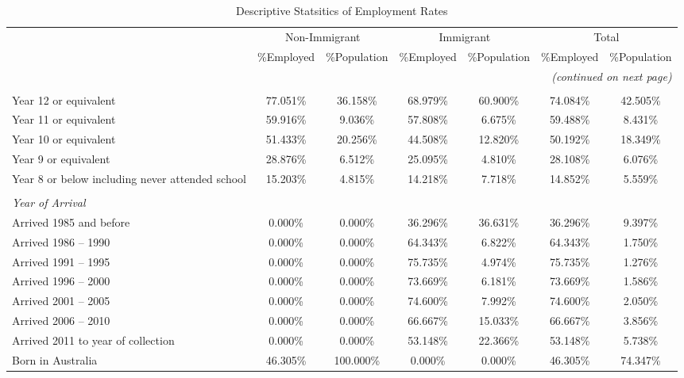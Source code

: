 \scriptsize\begin{longtable}{l*6c}
  \caption{Descriptive Statsitics of Employment Rates\label{tab:desp}} \\
  \toprule
  & \multicolumn{2}{c}{Non-Immigrant}
  & \multicolumn{2}{c}{Immigrant}
  & \multicolumn{2}{c}{Total} \\
  & \%Employed & \%Population
  & \%Employed & \%Population
  & \%Employed & \%Population \\
  \endhead
  \multicolumn{7}{r}{\textit{(continued on next page)}} \\\midrule
  \endfoot
  \bottomrule
  \endlastfoot
  \multicolumn{7}{l}{\textit{Education}} \\ \hline
  Year 12 or equivalent
  & 77.051\% & 36.158\%  & 68.979\% & 60.900\% & 74.084\% & 42.505\% \\
  Year 11 or equivalent
  & 59.916\% & 9.036\%   & 57.808\% & 6.675\%  & 59.488\% & 8.431\%  \\
  Year 10 or equivalent
  & 51.433\% & 20.256\%  & 44.508\% & 12.820\% & 50.192\% & 18.349\% \\
  Year 9 or equivalent
  & 28.876\% & 6.512\%   & 25.095\% & 4.810\%  & 28.108\% & 6.076\%  \\
  Year 8 or below including never attended school
  & 15.203\% & 4.815\%   & 14.218\% & 7.718\%  & 14.852\% & 5.559\%  \\
  \\
  \multicolumn{7}{l}{\textit{Year of Arrival}} \\ \hline
  Arrived 1985 and before
  & 0.000\%  & 0.000\%   & 36.296\% & 36.631\% & 36.296\% & 9.397\%  \\
  Arrived 1986 -- 1990
  & 0.000\%  & 0.000\%   & 64.343\% & 6.822\%  & 64.343\% & 1.750\%  \\
  Arrived 1991 -- 1995
  & 0.000\%  & 0.000\%   & 75.735\% & 4.974\%  & 75.735\% & 1.276\%  \\
  Arrived 1996 -- 2000
  & 0.000\%  & 0.000\%   & 73.669\% & 6.181\%  & 73.669\% & 1.586\%  \\
  Arrived 2001 -- 2005
  & 0.000\%  & 0.000\%   & 74.600\% & 7.992\%  & 74.600\% & 2.050\%  \\
  Arrived 2006 -- 2010
  & 0.000\%  & 0.000\%   & 66.667\% & 15.033\% & 66.667\% & 3.856\%  \\
  Arrived 2011 to year of collection
  & 0.000\%  & 0.000\%   & 53.148\% & 22.366\% & 53.148\% & 5.738\%  \\
  Born in Australia
  & 46.305\% & 100.000\% & 0.000\%  & 0.000\%  & 46.305\% & 74.347\% \\

\end{longtable}
